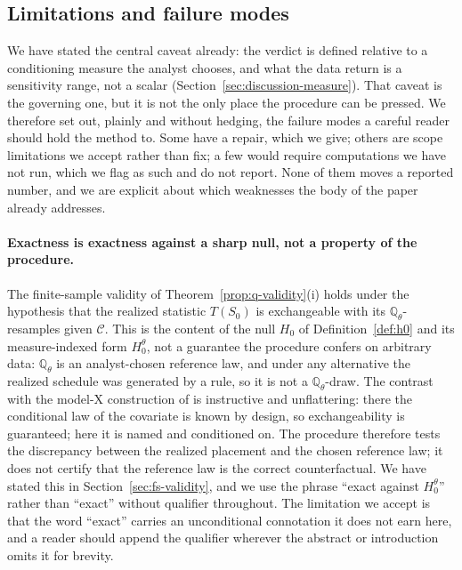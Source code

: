 \documentclass[risks,article,submit,pdftex,oneauthor]{Definitions/mdpi}
\begin{document}
\subsection{Limitations and failure modes}
\label{sec:limitations}

We have stated the central caveat already: the verdict is defined relative to a
conditioning measure the analyst chooses, and what the data return is a sensitivity
range, not a scalar (Section~\ref{sec:discussion-measure}). That caveat is the
governing one, but it is not the only place the procedure can be pressed. We
therefore set out, plainly and without hedging, the failure modes a careful reader
should hold the method to. Some have a repair, which we give; others are scope
limitations we accept rather than fix; a few would require computations we have not
run, which we flag as such and do not report. None of them moves a reported number,
and we are explicit about which weaknesses the body of the paper already addresses.

\paragraph{Exactness is exactness against a sharp null, not a property of the
procedure.} The finite-sample validity of Theorem~\ref{prop:q-validity}(i)
holds under the hypothesis that the realized statistic $T(S_0)$ is exchangeable with
its $\mathbb{Q}_\theta$-resamples given $\mathcal{C}$. This is the content of the
null $H_0$ of Definition~\ref{def:h0} and its measure-indexed form $H_0^\theta$, not a guarantee the procedure confers
on arbitrary data: $\mathbb{Q}_\theta$ is an analyst-chosen reference law, and under
any alternative the realized schedule was generated by a rule, so it is not a
$\mathbb{Q}_\theta$-draw. The contrast with the model-X construction of
\citep{Candes2018} is instructive and unflattering: there the conditional law of the
covariate is known by design, so exchangeability is guaranteed; here it is named and
conditioned on. The procedure therefore tests the discrepancy between the realized
placement and the chosen reference law; it does not certify that the reference law is
the correct counterfactual. We have stated this in
Section~\ref{sec:fs-validity}, and we use the phrase ``exact against $H_0^\theta$''
rather than ``exact'' without qualifier throughout. The limitation we accept is that
the word ``exact'' carries an unconditional connotation it does not earn here, and a
reader should append the qualifier wherever the abstract or introduction omits it for
brevity.
\end{document}
